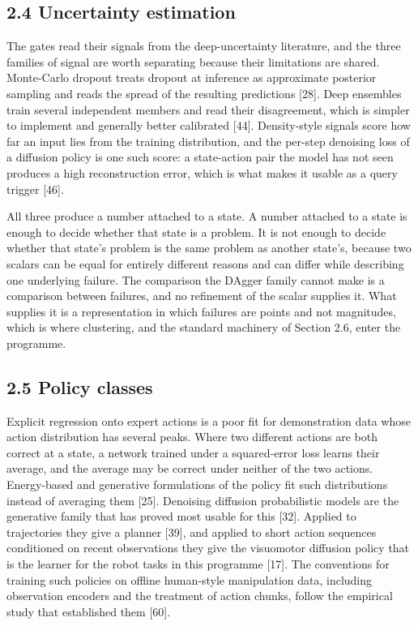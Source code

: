 \documentclass[
  11pt,
]{article}
\begin{document}
\hypertarget{uncertainty-estimation}{%
\subsection{2.4 Uncertainty estimation}\label{uncertainty-estimation}}

The gates read their signals from the deep-uncertainty literature, and
the three families of signal are worth separating because their
limitations are shared. Monte-Carlo dropout treats dropout at inference
as approximate posterior sampling and reads the spread of the resulting
predictions {[}28{]}. Deep ensembles train several independent members
and read their disagreement, which is simpler to implement and generally
better calibrated {[}44{]}. Density-style signals score how far an input
lies from the training distribution, and the per-step denoising loss of
a diffusion policy is one such score: a state-action pair the model has
not seen produces a high reconstruction error, which is what makes it
usable as a query trigger {[}46{]}.

All three produce a number attached to a state. A number attached to a
state is enough to decide whether that state is a problem. It is not
enough to decide whether that state's problem is the same problem as
another state's, because two scalars can be equal for entirely different
reasons and can differ while describing one underlying failure. The
comparison the DAgger family cannot make is a comparison between
failures, and no refinement of the scalar supplies it. What supplies it
is a representation in which failures are points and not magnitudes,
which is where clustering, and the standard machinery of Section 2.6,
enter the programme.

\hypertarget{policy-classes}{%
\subsection{2.5 Policy classes}\label{policy-classes}}

Explicit regression onto expert actions is a poor fit for demonstration
data whose action distribution has several peaks. Where two different
actions are both correct at a state, a network trained under a
squared-error loss learns their average, and the average may be correct
under neither of the two actions. Energy-based and generative
formulations of the policy fit such distributions instead of averaging
them {[}25{]}. Denoising diffusion probabilistic models are the
generative family that has proved most usable for this {[}32{]}. Applied
to trajectories they give a planner {[}39{]}, and applied to short
action sequences conditioned on recent observations they give the
visuomotor diffusion policy that is the learner for the robot tasks in
this programme {[}17{]}. The conventions for training such policies on
offline human-style manipulation data, including observation encoders
and the treatment of action chunks, follow the empirical study that
established them {[}60{]}.
\end{document}
